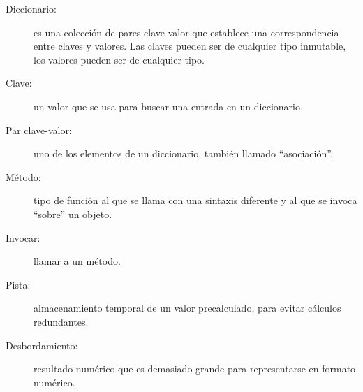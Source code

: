 \begin{description}

\item[Diccionario:] es una colección de pares clave-valor que establece una correspondencia 
entre claves y valores. Las claves pueden ser de cualquier tipo inmutable, los valores 
pueden ser de cualquier tipo.

\item[Clave:] un valor que se usa para buscar una entrada en un diccionario.

\item[Par clave-valor:] uno de los elementos de un diccionario, también llamado ``asociación''.

\item[Método:] tipo de función al que se llama con una sintaxis diferente y al que se invoca 
``sobre'' un objeto.

\item[Invocar:] llamar a un método.

\item[Pista:] almacenamiento temporal de un valor precalculado, para evitar cálculos
redundantes.

\item[Desbordamiento:] resultado numérico que es demasiado grande para representarse 
en formato numérico.


\end{description}
